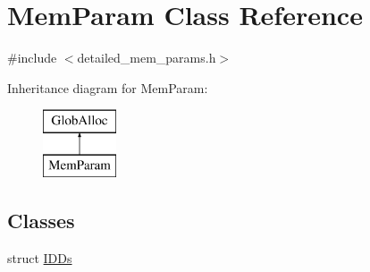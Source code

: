 \hypertarget{classMemParam}{\section{Mem\-Param Class Reference}
\label{classMemParam}
}


{\ttfamily \#include $<$detailed\-\_\-mem\-\_\-params.\-h$>$}

Inheritance diagram for Mem\-Param\-:\begin{figure}[H]
\begin{center}
\leavevmode
\includegraphics[height=2.000000cm]{classMemParam}
\end{center}
\end{figure}
\subsection*{Classes}
\begin{DoxyCompactItemize}
\item 
struct \hyperlink{structMemParam_1_1IDDs}{I\-D\-Ds}
\end{DoxyCompactItemize}
